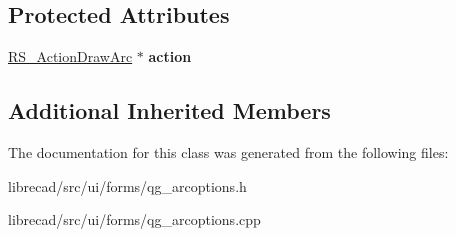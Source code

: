 \subsection*{Protected Attributes}
\begin{DoxyCompactItemize}
\item 
\hypertarget{classQG__ArcOptions_a6c68a03b5c8ccaa71e45a6982ae0d98b}{\hyperlink{classRS__ActionDrawArc}{R\-S\-\_\-\-Action\-Draw\-Arc} $\ast$ {\bfseries action}}\label{classQG__ArcOptions_a6c68a03b5c8ccaa71e45a6982ae0d98b}

\end{DoxyCompactItemize}
\subsection*{Additional Inherited Members}


The documentation for this class was generated from the following files\-:\begin{DoxyCompactItemize}
\item 
librecad/src/ui/forms/qg\-\_\-arcoptions.\-h\item 
librecad/src/ui/forms/qg\-\_\-arcoptions.\-cpp\end{DoxyCompactItemize}
